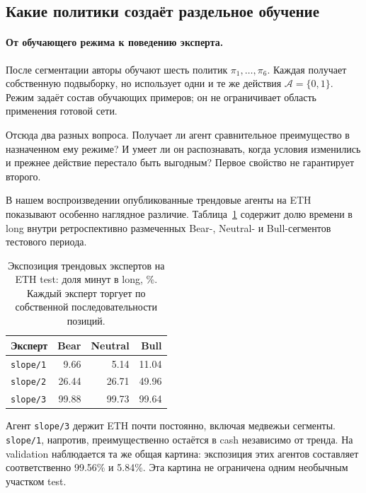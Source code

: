\documentclass[9pt,a4paper,twocolumn]{extarticle}
\begin{document}
\subsection{Какие политики создаёт раздельное обучение}
\label{sec:expert_specialization}

\paragraph{От обучающего режима к поведению эксперта.}

После сегментации авторы обучают шесть политик $\pi_1,\ldots,\pi_6$. Каждая получает собственную
подвыборку, но использует одни и те же действия $\mathcal A=\{0,1\}$. Режим задаёт состав
обучающих примеров; он не ограничивает область применения готовой сети.

Отсюда два разных вопроса. Получает ли агент сравнительное преимущество в назначенном ему
режиме? И умеет ли он распознавать, когда условия изменились и прежнее действие перестало быть
выгодным? Первое свойство не гарантирует второго.

В нашем воспроизведении опубликованные трендовые агенты на ETH показывают особенно наглядное
различие. Таблица~\ref{tab:conditional_exposure} содержит долю времени в long внутри
ретроспективно размеченных Bear-, Neutral- и Bull-сегментов тестового периода.

\begin{table}[t]
  \centering
  \caption{Экспозиция трендовых экспертов на ETH test: доля минут в long, \%.
  Каждый эксперт торгует по собственной последовательности позиций.}
  \label{tab:conditional_exposure}
  \footnotesize
  \renewcommand{\arraystretch}{1.15}
  \begin{tabular}{@{}lrrr@{}}
    \toprule
    Эксперт & Bear & Neutral & Bull\\
    \midrule
    \texttt{slope/1} & 9.66 & 5.14 & 11.04\\
    \texttt{slope/2} & 26.44 & 26.71 & 49.96\\
    \texttt{slope/3} & 99.88 & 99.73 & 99.64\\
    \bottomrule
  \end{tabular}
\end{table}

Агент \texttt{slope/3} держит ETH почти постоянно, включая медвежьи сегменты. \texttt{slope/1},
напротив, преимущественно остаётся в cash независимо от тренда. На validation наблюдается та же
общая картина: экспозиция этих агентов составляет соответственно 99.56\% и 5.84\%. Эта картина
не ограничена одним необычным участком test.
\end{document}
